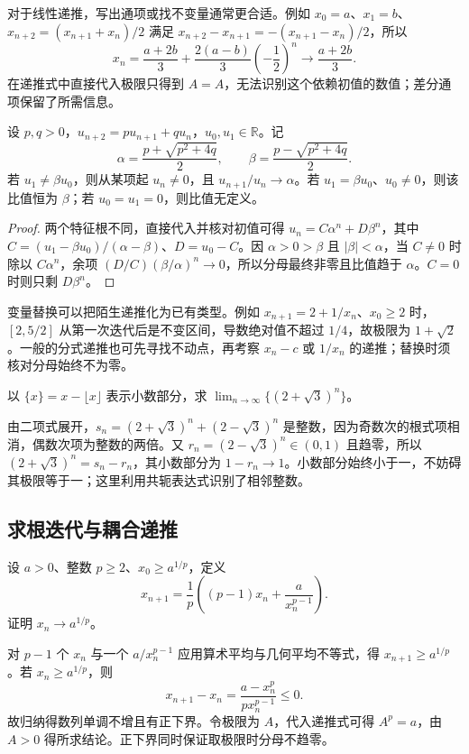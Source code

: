 对于线性递推，写出通项或找不变量通常更合适。例如 $x_0=a$、$x_1=b$、$x_{n+2}=(x_{n+1}+x_n)/2$ 满足 $x_{n+2}-x_{n+1}=-(x_{n+1}-x_n)/2$，所以
\[
    x_n=\frac{a+2b}{3}+\frac{2(a-b)}3\left(-\frac12\right)^n
    \longrightarrow\frac{a+2b}{3}.
\]
在递推式中直接代入极限只得到 $A=A$，无法识别这个依赖初值的数值；差分通项保留了所需信息。

\begin{proposition}[二阶线性递推的比值]
\label{prop:pei-second-order-ratio}
设 $p,q>0$，$u_{n+2}=pu_{n+1}+qu_n$，$u_0,u_1\in\mathbb{R}$。记
\[
    \alpha=\frac{p+\sqrt{p^2+4q}}2,\qquad
    \beta=\frac{p-\sqrt{p^2+4q}}2.
\]
若 $u_1\ne\beta u_0$，则从某项起 $u_n\ne0$，且 $u_{n+1}/u_n\to\alpha$。若 $u_1=\beta u_0$、$u_0\ne0$，则该比值恒为 $\beta$；若 $u_0=u_1=0$，则比值无定义。
\end{proposition}
\begin{proof}
两个特征根不同，直接代入并核对初值可得 $u_n=C\alpha^n+D\beta^n$，其中 $C=(u_1-\beta u_0)/(\alpha-\beta)$、$D=u_0-C$。因 $\alpha>0>\beta$ 且 $|\beta|<\alpha$，当 $C\ne0$ 时除以 $C\alpha^n$，余项 $(D/C)(\beta/\alpha)^n\to0$，所以分母最终非零且比值趋于 $\alpha$。$C=0$ 时则只剩 $D\beta^n$。
\end{proof}

变量替换可以把陌生递推化为已有类型。例如 $x_{n+1}=2+1/x_n$、$x_0\ge2$ 时，$[2,5/2]$ 从第一次迭代后是不变区间，导数绝对值不超过 $1/4$，故极限为 $1+\sqrt2$。一般的分式递推也可先寻找不动点，再考察 $x_n-c$ 或 $1/x_n$ 的递推；替换时须核对分母始终不为零。

\begin{example}
\label{ex:pei-conjugate-fractional-part}
以 $\{x\}=x-\lfloor x\rfloor$ 表示小数部分，求 $\displaystyle\lim_{n\to\infty}\{(2+\sqrt3)^n\}$。
\end{example}
\begin{solve}
由二项式展开，$s_n=(2+\sqrt3)^n+(2-\sqrt3)^n$ 是整数，因为奇数次的根式项相消，偶数次项为整数的两倍。又 $r_n=(2-\sqrt3)^n\in(0,1)$ 且趋零，所以 $(2+\sqrt3)^n=s_n-r_n$，其小数部分为 $1-r_n\to1$。小数部分始终小于一，不妨碍其极限等于一；这里利用共轭表达式识别了相邻整数。
\end{solve}

\subsection{求根迭代与耦合递推}

\begin{example}
\label{ex:pei-newton-pth-root}
设 $a>0$、整数 $p\ge2$、$x_0\ge a^{1/p}$，定义
\[
    x_{n+1}=\frac1p\left((p-1)x_n+\frac{a}{x_n^{p-1}}\right).
\]
证明 $x_n\to a^{1/p}$。
\end{example}
\begin{solve}
对 $p-1$ 个 $x_n$ 与一个 $a/x_n^{p-1}$ 应用算术平均与几何平均不等式，得 $x_{n+1}\ge a^{1/p}$。若 $x_n\ge a^{1/p}$，则
\[
    x_{n+1}-x_n=\frac{a-x_n^p}{p x_n^{p-1}}\le0.
\]
故归纳得数列单调不增且有正下界。令极限为 $A$，代入递推式可得 $A^p=a$，由 $A>0$ 得所求结论。正下界同时保证取极限时分母不趋零。
\end{solve}


